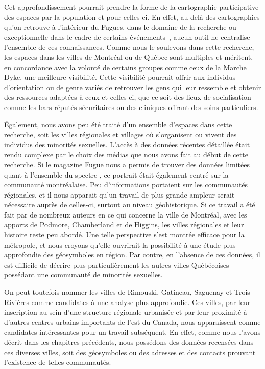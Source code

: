 Cet approfondissement pourrait prendre la forme de la cartographie participative des espaces \lgbt{} par la population et pour celles-ci.
En effet, au-delà des cartographies qu'on retrouve à l'intérieur du Fugues, dans le domaine de la recherche  ou exceptionnelle dans le cadre de certains événements~\parencite{Pervers/Cite2015}, aucun outil ne centralise l'ensemble de ces connaissances.
Comme nous le soulevons dans cette recherche, les espaces \lgbt{} dans les villes de Montréal ou de Québec sont multiples et méritent, en concordance avec la volonté de certains groupes comme ceux de la Marche Dyke, une meilleure visibilité.
Cette visibilité pourrait offrir aux individus d'orientation ou de genre variés de retrouver les gens qui leur ressemble et obtenir des ressources adaptées à ceux et celles-ci, que ce soit des lieux de socialisation comme les bars réputés sécuritaires ou des cliniques offrant des soins particuliers.

Également, nous avons peu été traité d'un ensemble d'espaces dans cette recherche, soit les villes régionales et villages où s'organisent ou vivent des individus des minorités sexuelles.
L'accès à des données récentes détaillée était rendu complexe par le choix des médias que nous avons fait au début de cette recherche.
Si le magazine Fugue nous a permis de trouver des données limitées quant à l'ensemble du spectre \lgbt, ce portrait était également centré sur la communauté montréalaise.
Peu d'informations portaient sur les communautés régionales, et il nous apparait qu'un travail de plus grande ampleur serait nécessaire auprès de celles-ci, surtout au niveau géohistorique.
Si ce travail a été fait par de nombreux auteurs en ce qui concerne la ville de Montréal, avec les apports de Podmore, Chamberland et de Higgins, les villes régionales et leur histoire reste peu abordé.
Une telle perspective s'est montrée efficace pour la métropole, et nous croyons qu'elle ouvrirait la possibilité à une étude plus approfondie des géosymboles en région. 
Par contre, en l'absence de ces données, il est difficile de décrire plus particulièrement les autres villes Québécoises possédant une communauté de minorités sexuelles.

On peut toutefois nommer les villes de Rimouski, Gatineau, Saguenay et Trois-Rivières comme candidates à une analyse plus approfondie.
Ces villes, par leur inscription au sein d'une structure régionale urbanisée et par leur proximité à d'autres centres urbains importants de l'est du Canada, nous apparaissent comme candidates intéressantes pour un travail subséquent.
En effet, comme nous l'avons décrit dans les chapitres précédents, nous possédons des données recensées dans ces diverses villes, soit des géosymboles ou des adresses et des contacts prouvant l'existence de telles communautés.

